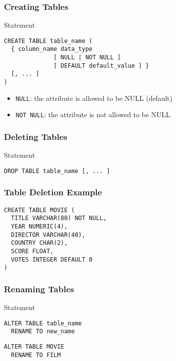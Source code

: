 \documentclass[dvipsnames]{beamer}
\theoremstyle{plain}
\begin{document}
\begin{frame}[fragile]
  \frametitle{Creating Tables}

  \begin{block}{Statement}
    \begin{lstlisting}
CREATE TABLE table_name (
  { column_name data_type
              [ NULL | NOT NULL ]
              [ DEFAULT default_value ] }
  [, ... ]
)
    \end{lstlisting}
  \end{block}

  \pause
  \begin{itemize}
    \item \lstinline!NULL!: the attribute is allowed to be NULL (default)
    \item \lstinline!NOT NULL!: the attribute is not allowed to be NULL
  \end{itemize}
\end{frame}

\begin{frame}[fragile]
  \frametitle{Deleting Tables}

  \begin{block}{Statement}
    \begin{lstlisting}
DROP TABLE table_name [, ... ]
    \end{lstlisting}
  \end{block}
\end{frame}

\begin{frame}[fragile]
  \frametitle{Table Deletion Example}

  \begin{example}
    \begin{lstlisting}
CREATE TABLE MOVIE (
  TITLE VARCHAR(80) NOT NULL,
  YEAR NUMERIC(4),
  DIRECTOR VARCHAR(40),
  COUNTRY CHAR(2),
  SCORE FLOAT,
  VOTES INTEGER DEFAULT 0
)
    \end{lstlisting}
  \end{example}
\end{frame}

\begin{frame}[fragile]
  \frametitle{Renaming Tables}

  \begin{block}{Statement}
    \begin{lstlisting}
ALTER TABLE table_name
  RENAME TO new_name
    \end{lstlisting}
  \end{block}

  \pause
  \begin{example}
    \begin{lstlisting}
ALTER TABLE MOVIE
  RENAME TO FILM
    \end{lstlisting}
  \end{example}
\end{frame}
\end{document}
